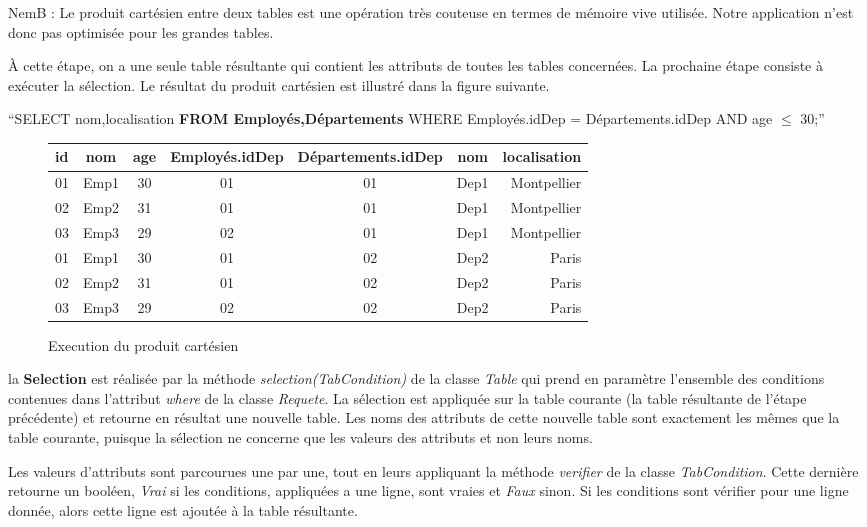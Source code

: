 \documentclass[oneside,13pt,a4paper]{report}
\newcommand\nb[1][0.3]{N\kern-#1emB : }
\begin{document}
\nb Le produit cartésien entre deux tables est une opération très couteuse en termes de mémoire vive utilisée. Notre application n'est donc pas optimisée pour les grandes tables.

À cette étape, on a une seule table résultante qui contient les attributs de toutes les tables concernées. La prochaine étape consiste à exécuter la sélection. Le résultat du produit cartésien est illustré dans la figure suivante.

\begin{center}
	\enquote{SELECT nom,localisation \textbf{FROM Employés,Départements} WHERE Employés.idDep = Départements.idDep AND age $\leq$ 30;}
	\begin{figure}[h!]
		\centering
		\caption{Execution du produit cartésien}
		\begin{tabular}{|l|c|c|c|c|c|r|}
			\hline
			id & nom  & age & Employés.idDep & Départements.idDep & nom  & localisation
			\\
			\hline
			01 & Emp1 & 30  & 01             & 01                 & Dep1 & Montpellier  \\
			02 & Emp2 & 31  & 01             & 01                 & Dep1 & Montpellier  \\
			03 & Emp3 & 29  & 02             & 01                 & Dep1 & Montpellier  \\
			01 & Emp1 & 30  & 01             & 02                 & Dep2 & Paris        \\
			02 & Emp2 & 31  & 01             & 02                 & Dep2 & Paris        \\
			03 & Emp3 & 29  & 02             & 02                 & Dep2 & Paris        \\
			\hline
		\end{tabular}
	\end{figure}
\end{center}

la \textbf{Selection} est réalisée par la méthode \textit{selection(TabCondition)} de la classe \textit{Table} qui prend en paramètre l'ensemble des conditions contenues dans l'attribut \textit{where} de la classe \textit{Requete}. La sélection est appliquée sur la table courante (la table résultante de l'étape précédente) et retourne en résultat une nouvelle table. Les noms des attributs de cette nouvelle table sont exactement les mêmes que la table courante, puisque la sélection ne concerne que les valeurs des attributs et non leurs noms.

Les valeurs d'attributs sont parcourues une par une, tout en leurs appliquant la méthode \textit{verifier} de la classe \textit{TabCondition}. Cette dernière retourne un booléen, \textit{Vrai} si les conditions, appliquées a une ligne, sont vraies et \textit{Faux} sinon. Si les conditions sont vérifier pour une ligne donnée, alors cette ligne est ajoutée à la table résultante.
\end{document}
